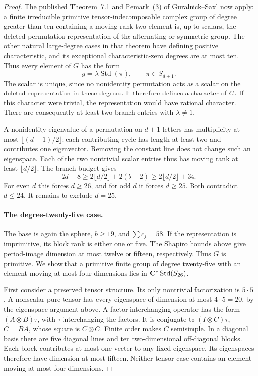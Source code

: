 \begin{proof}
The published Theorem~7.1 and Remark~(3) of Guralnick--Saxl \cite[pp.~548--549]{GS} now apply: a finite irreducible primitive tensor-indecomposable complex group of degree greater than ten containing a moving-rank-two element is, up to scalars, the deleted permutation representation of the alternating or symmetric group. The other natural large-degree cases in that theorem have defining positive characteristic, and its exceptional characteristic-zero degrees are at most ten. Thus every element of $G$ has the form
\[
 g=\lambda\operatorname{Std}(\pi),\qquad\pi\in S_{d+1}.
\]
The scalar is unique, since no nonidentity permutation acts as a scalar on the deleted representation in these degrees. It therefore defines a character of $G$. If this character were trivial, the representation would have rational character. There are consequently at least two branch entries with $\lambda\ne1$.

A nonidentity eigenvalue of a permutation on $d+1$ letters has multiplicity at most $\lfloor(d+1)/2\rfloor$: each contributing cycle has length at least two and contributes one eigenvector. Removing the constant line does not change such an eigenspace. Each of the two nontrivial scalar entries thus has moving rank at least $\lfloor d/2\rfloor$. The branch budget gives
\[
 2d+8\ge2\lfloor d/2\rfloor+2(b-2)
       \ge2\lfloor d/2\rfloor+34.
\]
For even $d$ this forces $d\ge26$, and for odd $d$ it forces $d\ge25$. Both contradict $d\le24$. It remains to exclude $d=25$.

\paragraph{The degree-twenty-five case.}
The base is again the sphere, $b\ge19$, and $\sum c_j=58$. If the
representation is imprimitive, its block rank is either one or five.
The Shapiro bounds above give period-image dimension at most twelve
or fifteen, respectively. Thus $G$ is primitive. We show that a
primitive finite group of degree twenty-five with an element moving
at most four dimensions lies in
$\mathbf C^*\operatorname{Std}(S_{26})$.

First consider a preserved tensor structure. Its only nontrivial
factorization is $5\cdot5$. A nonscalar pure tensor has every
 eigenspace of dimension at most $4\cdot5=20$, by the eigenspace
argument above. A factor-interchanging operator has the form
$(A\otimes B)\tau$, with $\tau$ interchanging the factors. It is
conjugate to $(I\otimes C)\tau$, $C=BA$, whose square is
$C\otimes C$. Finite order makes $C$ semisimple. In a diagonal basis
there are five diagonal lines and ten two-dimensional off-diagonal
blocks. Each block contributes at most one vector to any fixed
 eigenspace. Its eigenspaces therefore have dimension at most fifteen.
Neither tensor case contains an element moving at most four dimensions.


\end{proof}

